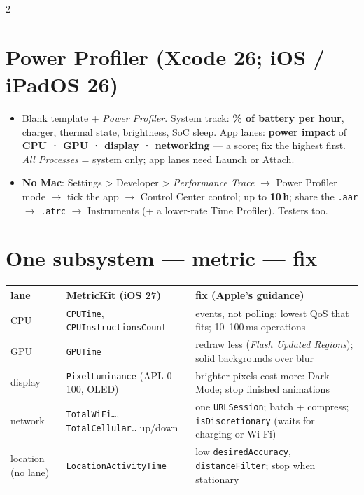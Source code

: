 \documentclass[8pt]{extarticle}
\newcommand\ct[1]{\texttt{#1}}
\begin{document}
\begin{multicols}{2}
\columnbreak

\section{Power Profiler (Xcode 26; iOS / iPadOS 26)}
\begin{itemize}
  \item Blank template + \emph{Power Profiler}. System track: \textbf{\% of battery per hour},
        charger, thermal state, brightness, SoC sleep. App lanes: \textbf{power impact} of
        \textbf{CPU · GPU · display · networking} — a score; fix the highest first.
        \emph{All Processes} = system only; app lanes need Launch or Attach.
  \item \textbf{No Mac}: Settings > Developer > \emph{Performance Trace} $\to$ Power Profiler
        mode $\to$ tick the app $\to$ Control Center control; up to \textbf{10\,h}; share the
        \ct{.aar} $\to$ \ct{.atrc} $\to$ Instruments (+ a lower-rate Time Profiler). Testers too.
\end{itemize}

\section{One subsystem — metric — fix}
{\footnotesize\setlength{\tabcolsep}{3pt}
\begin{tabular}{@{}>{\raggedright\arraybackslash}p{12mm}>{\raggedright\arraybackslash}p{24mm}>{\raggedright\arraybackslash}p{39mm}@{}}
\toprule
\textbf{lane} & \textbf{MetricKit (iOS 27)} & \textbf{fix (Apple's guidance)}\\ \midrule
CPU & \ct{CPUTime}, \ct{CPUInstructionsCount} & events, not polling; lowest QoS that fits; 10--100\,ms operations\\
GPU & \ct{GPUTime} & redraw less (\emph{Flash Updated Regions}); solid backgrounds over blur\\
display & \ct{PixelLuminance} (APL 0--100, OLED) & brighter pixels cost more: Dark Mode; stop finished animations\\
network & \ct{TotalWiFi…}, \ct{TotalCellular…} up/down & one \ct{URLSession}; batch + compress; \ct{isDiscretionary} (waits for charging or Wi-Fi)\\
location (no lane) & \ct{LocationActivityTime} & low \ct{desiredAccuracy}, \ct{distanceFilter}; stop when stationary\\
\bottomrule
\end{tabular}}


\end{multicols}
\end{document}
